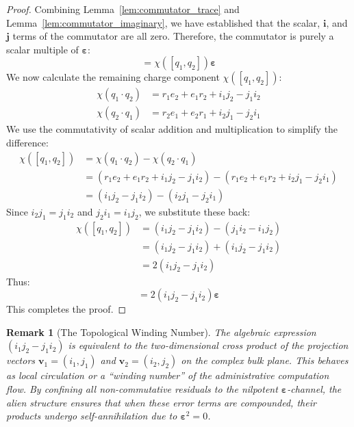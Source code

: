 \documentclass[11pt,a4paper]{book}
\newtheorem{remark}[theorem]{Remark}
\begin{document}
\begin{proof}
Combining Lemma~\ref{lem:commutator_trace} and Lemma~\ref{lem:commutator_imaginary}, we have established that the scalar, $\mathbf{i}$, and $\mathbf{j}$ terms of the commutator are all zero. 
Therefore, the commutator is purely a scalar multiple of $\boldsymbol{\varepsilon}$:
\begin{equation}
[q_1, q_2] = \chi([q_1, q_2])\boldsymbol{\varepsilon}
\end{equation}
We now calculate the remaining charge component $\chi([q_1, q_2])$:
\begin{align}
\chi(q_1 \cdot q_2) &= r_1 e_2 + e_1 r_2 + i_1 j_2 - j_1 i_2 \\
\chi(q_2 \cdot q_1) &= r_2 e_1 + e_2 r_1 + i_2 j_1 - j_2 i_1
\end{align}
We use the commutativity of scalar addition and multiplication to simplify the difference:
\begin{align}
\chi([q_1, q_2]) &= \chi(q_1 \cdot q_2) - \chi(q_2 \cdot q_1) \nonumber \\
&= (r_1 e_2 + e_1 r_2 + i_1 j_2 - j_1 i_2) - (r_1 e_2 + e_1 r_2 + i_2 j_1 - j_2 i_1) \nonumber \\
&= (i_1 j_2 - j_1 i_2) - (i_2 j_1 - j_2 i_1)
\end{align}
Since $i_2 j_1 = j_1 i_2$ and $j_2 i_1 = i_1 j_2$, we substitute these back:
\begin{align}
\chi([q_1, q_2]) &= (i_1 j_2 - j_1 i_2) - (j_1 i_2 - i_1 j_2) \nonumber \\
&= (i_1 j_2 - j_1 i_2) + (i_1 j_2 - j_1 i_2) \nonumber \\
&= 2(i_1 j_2 - j_1 i_2)
\end{align}
Thus:
\begin{equation}
[q_1, q_2] = 2(i_1 j_2 - j_1 i_2)\boldsymbol{\varepsilon}
\end{equation}
This completes the proof.
\end{proof}

\begin{remark}[The Topological Winding Number]
The algebraic expression $(i_1 j_2 - j_1 i_2)$ is equivalent to the two-dimensional cross product of the projection vectors $\mathbf{v}_1 = (i_1, j_1)$ and $\mathbf{v}_2 = (i_2, j_2)$ on the complex bulk plane. 
This behaves as local circulation or a ``winding number'' of the administrative computation flow. 
By confining all non-commutative residuals to the nilpotent $\boldsymbol{\varepsilon}$-channel, the alien structure ensures that when these error terms are compounded, their products undergo self-annihilation due to $\boldsymbol{\varepsilon}^2 = 0$.
\end{remark}
\end{document}
